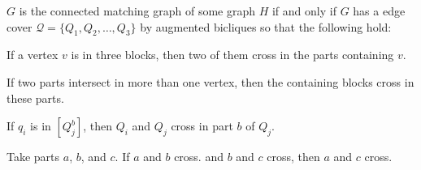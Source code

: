 


\begin{theorem}
$G$ is the connected matching graph of some graph $H$ if and only if $G$ has a edge cover $\mathcal{Q} = \{Q_1, Q_2, \ldots, Q_3\}$ by augmented bicliques so that the following hold:
\begin{description}
{\setlength\itemindent{0.5cm}
	\item[1.] If a vertex $v$ is in three blocks, then two of them cross in the parts containing $v$.
	\item[2.] If two parts intersect in more than one vertex, then the containing blocks cross in these parts.
	\item[3.] If $q_i$ is in $[Q_j^b]$, then $Q_i$ and $Q_j$ cross in part $b$ of $Q_j$.
	\item[4.] Take parts $a$, $b$, and $c$.  If $a$ and $b$ cross. and $b$ and $c$ cross, then $a$ and $c$ cross.
	\item[5.] }
\end{description}
\end{theorem}

